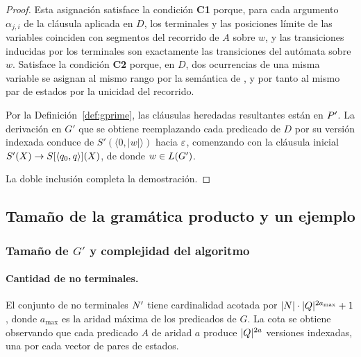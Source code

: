 \begin{proof}
Esta asignación satisface la condición \textbf{C1} porque, para cada argumento $\alpha_{j,i}$ de la cláusula aplicada en $D$, los terminales y las posiciones límite de las variables coinciden con segmentos del recorrido de $A$ sobre $w$, y las transiciones inducidas por los terminales son exactamente las transiciones del autómata sobre $w$. Satisface la condición \textbf{C2} porque, en $D$, dos ocurrencias de una misma variable se asignan al mismo rango por la semántica de \PRCG, y por tanto al mismo par de estados por la unicidad del recorrido.

Por la Definición~\ref{def:gprime}, las cláusulas heredadas resultantes están en $P'$. La derivación en $G'$ que se obtiene reemplazando cada predicado de $D$ por su versión indexada conduce de $S'(\langle 0, \lvert w \rvert \rangle)$ hacia $\varepsilon$, comenzando con la cláusula inicial $S'(X) \to S[\langle q_0, q \rangle](X)$, de donde $w \in L(G')$.

La doble inclusión completa la demostración.
\end{proof}

\subsection{Tamaño de la gramática producto y un ejemplo}\label{sec:tamano}

\subsubsection{Tamaño de \texorpdfstring{$G'$}{Gprime} y complejidad del algoritmo}\label{sec:complejidad}

\paragraph{Cantidad de no terminales.} El conjunto de no terminales $N'$ tiene cardinalidad acotada por $\lvert N \rvert \cdot \lvert Q \rvert^{2 a_{\max}} + 1$, donde $a_{\max}$ es la aridad máxima de los predicados de $G$. La cota se obtiene observando que cada predicado $A$ de aridad $a$ produce $\lvert Q \rvert^{2 a}$ versiones indexadas, una por cada vector de pares de estados.

